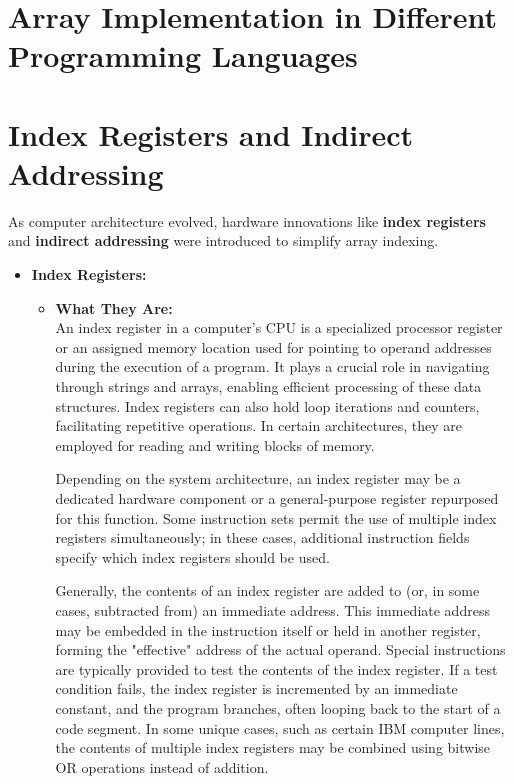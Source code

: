 \documentclass{book}
\begin{document}
\section{Array Implementation in Different Programming Languages}
\section{Index Registers and Indirect Addressing}

As computer architecture evolved, hardware innovations like \textbf{index registers} and  \textbf{indirect addressing} were introduced to simplify array indexing.
\begin{itemize}
	\item \textbf{Index Registers:}
	\begin{itemize}
		\item \textbf{What They Are:} \\
		An index register in a computer's CPU is a specialized processor register or an assigned memory location used for pointing to operand addresses during the execution of a program. It plays a crucial role in navigating through strings and arrays, enabling efficient processing of these data structures. Index registers can also hold loop iterations and counters, facilitating repetitive operations. In certain architectures, they are employed for reading and writing blocks of memory.
		
		Depending on the system architecture, an index register may be a dedicated hardware component or a general-purpose register repurposed for this function. Some instruction sets permit the use of multiple index registers simultaneously; in these cases, additional instruction fields specify which index registers should be used.
		
		Generally, the contents of an index register are added to (or, in some cases, subtracted from) an immediate address. This immediate address may be embedded in the instruction itself or held in another register, forming the "effective" address of the actual operand. Special instructions are typically provided to test the contents of the index register. If a test condition fails, the index register is incremented by an immediate constant, and the program branches, often looping back to the start of a code segment. In some unique cases, such as certain IBM computer lines, the contents of multiple index registers may be combined using bitwise OR operations instead of addition.
		

\end{itemize}
\end{itemize}
\end{document}
